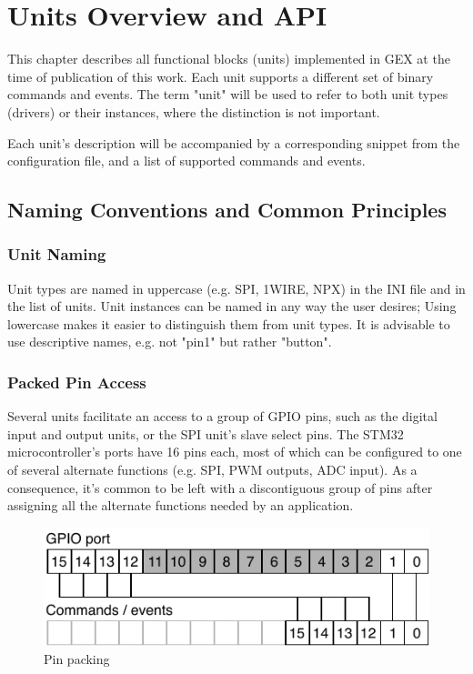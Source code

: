 \chapter{Units Overview and API}

This chapter describes all functional blocks (units) implemented in GEX at the time of publication of this work. Each unit supports a different set of binary commands and events. The term "unit" will be used to refer to both unit types (drivers) or their instances, where the distinction is not important.

Each unit's description will be accompanied by a corresponding snippet from the configuration file, and a list of supported commands and events.

\section{Naming Conventions and Common Principles}

\subsection{Unit Naming}

Unit types are named in uppercase (e.g. SPI, 1WIRE, NPX) in the INI file and in the list of units. Unit instances can be named in any way the user desires; Using lowercase makes it easier to distinguish them from unit types. It is advisable to use descriptive names, e.g. not "pin1" but rather "button".

\subsection{Packed Pin Access}

Several units facilitate an access to a group of GPIO pins, such as the digital input and output units, or the SPI unit's slave select pins. The STM32 microcontroller's ports have 16 pins each, most of which can be configured to one of several alternate functions (e.g. SPI, PWM outputs, ADC input). As a consequence, it's common to be left with a discontiguous group of pins after assigning all the alternate functions needed by an application. 

\begin{figure}[h]
	\centering
	\includegraphics[scale=1] {img/pin-packing.pdf}
	\caption{\label{fig:pin-packing}Pin packing}
\end{figure}

